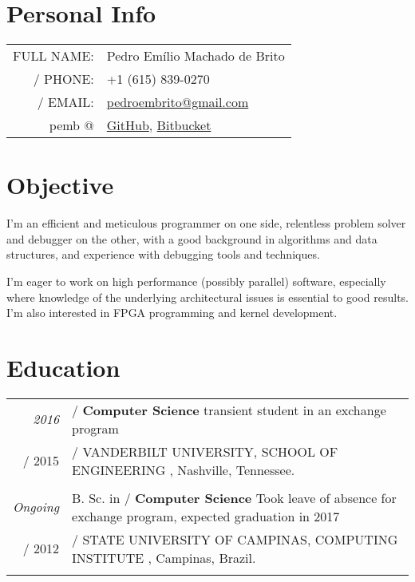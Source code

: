 \documentclass[a4paper,10pt]{article}
\makeatletter
\def\fakesc#1{%
  \begingroup%
  \xdef\fake@name{\csname\curr@fontshape/\f@size\endcsname}%
  \fontsize{\fontdimen8\fake@name}{\baselineskip}\selectfont%
  \uppercase{#1}%
  \endgroup%
}
\renewcommand{\textsc}{\fakesc}
\makeatother
\begin{document}
\pagestyle{empty} %

\par{\centering{\Huge Pedro \textsc{Brito}}\bigskip\par}

\section{Personal Info}

 \begin{tabularx}{\textwidth}{ rl}
 \textsc{Full name:} & Pedro Emílio Machado de Brito \\
    \textsc{Phone:} & +1 (615) 839-0270 \\
    \textsc{Email:} & \href{mailto:pedroembrito@gmail.com}{pedroembrito@gmail.com}\\
    \footnotesize{pemb @} & \href{https://github.com/pemb/}{GitHub}, \href{https://bitbucket.org/pemb}{Bitbucket}\\
\end{tabularx}

\section{Objective}

I'm an efficient and meticulous programmer on one side, relentless problem solver and debugger on the other, with a good background in algorithms and data structures, and experience with debugging tools and techniques.

I'm eager to work on high performance (possibly parallel) software, especially where knowledge of the underlying architectural issues is essential to good results. I'm also interested in FPGA programming and kernel development.

\section{Education}

\begin{tabularx}{\textwidth}{r|X}	

  \emph{2016} & \textsc{}\textbf{Computer Science} transient student in an exchange program  \\
  \textsc{2015} & \textsc{Vanderbilt University, School of Engineering}, Nashville, Tennessee.\\ 
  \multicolumn{2}{c}{}\\

  \emph{Ongoing} & B. Sc. in \textsc{}\textbf{Computer Science} {\tiny Took leave of absence for exchange program, expected graduation in 2017} \\
  \textsc{2012} & \textsc{State University of Campinas, Computing Institute}, Campinas, Brazil.\\ 
  \multicolumn{2}{c}{}\\

\end{tabularx}
\end{document}

